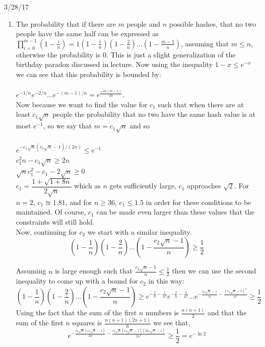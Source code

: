 \documentclass{article}
\begin{document}
	
 \hspace{5.5in} 3/28/17\\

\begin{enumerate}
	\item The probability that if there are $m$ people and $n$ possible hashes, that no two people have the same half can be expressed as $\displaystyle\prod_{i = 0}^{m-1}(1-\frac{i}{n}) = 1(1 - \frac{1}{n})(1-\frac{2}{n})...(1 - \frac{m-1}{n})$, assuming that $m \leq n$, otherwise the probability is 0.  This is just a slight generalization of the birthday paradox discussed in lecture.  Now using the inequality $1 - x \leq e^{-x}$ we can see that this probability is bounded by: \\\\
	$e^{-1/n}e^{-2/n}...e^{-(m-1)/n} = e^{\frac{-m(m-1)}{2n} }$. \\
	Now because we want to find the value for $c_1$ such that when there are at least $c_1\sqrt{n}$ people the probability that no two have the same hash value is at most $e^{-1}$,  so we say that $m = c_1\sqrt{n}$ and so \\\\
	$e^{-c_1\sqrt{n}(c_1\sqrt{n} - 1) / (2n)} \leq e ^{-1}$ \\
	$c_1^2n - c_1\sqrt{n} \geq 2n$ \\
	$\sqrt{n}c_1^2 - c_1 - 2 \sqrt{n} \geq 0$ \\
	$c_1 = \dfrac{1 + \sqrt{1 + 8n}}{2 \sqrt{n} }$ which as $n$ gets sufficiently large, $c_1$ approaches $\sqrt{2}$.  For $n = 2$, $c_1 \approxeq 1.81$, and for $n\geq 36$, $c_1 \leq 1.5$ in order for these conditions to be maintained.  Of course, $c_1$ can be made even larger than these values that the constraints will still hold. \\
	
	Now, continuing for $c_2$ we start with a similar inequality.  \\
	
	\[ (1 - \frac{1}{n})(1-\frac{2}{n})...(1 - \frac{c_2\sqrt{n}-1}{n})\geq \frac{1}{2} \]
	
	Assuming $n$ is large enough such that $\frac{c_2\sqrt{n}-1}{n}\leq \frac{1}{2}$ then we can use the second inequality to come up with a bound for $c_2$ in this way: \\
	
	\[ (1 - \frac{1}{n})(1-\frac{2}{n})...(1 - \frac{c_2\sqrt{n}-1}{n}) \geq e^{-\frac{1}{n} - \frac{1}{n^2}}e^{-\frac{2}{n}-\frac{4}{n^2}}...e^{-\frac{c_2\sqrt{n} - 1}{n} - \frac{(c_2\sqrt{n} - 1)^2}{n^2}} \geq \frac{1}{2} \]
	Using the fact that the sum of the first $n$ numbers is $\frac{n(n+1)}{2}$ and that the sum of the first $n$ squares is $\frac{n(n+1)(2n+1)}{6}$ we see that, \\
	\[e^{-\frac{c_2\sqrt{n}(c_2\sqrt{n} - 1)}{2n} - \frac{c_2\sqrt{n}(c_2\sqrt{n}-1)(2c_2\sqrt{n} - 1)}{2n^2}} \geq \frac{1}{2} = e^{-\ln2} \] \\
	

\end{enumerate}
\end{document}

